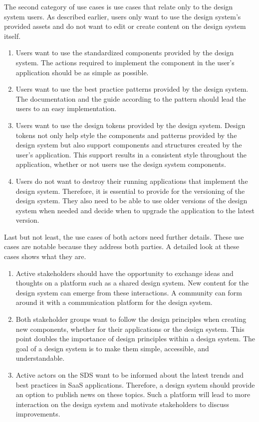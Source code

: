 The second category of use cases is use cases that relate only to the design system users. As described earlier, users only want to use the design system's provided assets and do not want to edit or create content on the design system itself.
\begin{enumerate}
    \item Users want to use the standardized components provided by the design system. The actions required to implement the component in the user's application should be as simple as possible.
    \item Users want to use the best practice patterns provided by the design system. The documentation and the guide according to the pattern should lead the users to an easy implementation.
    \item Users want to use the design tokens provided by the design system. Design tokens not only help style the components and patterns provided by the design system but also support components and structures created by the user's application. This support results in a consistent style throughout the application, whether or not users use the design system components. 
    \item Users do not want to destroy their running applications that implement the design system. Therefore, it is essential to provide for the versioning of the design system. They also need to be able to use older versions of the design system when needed and decide when to upgrade the application to the latest version. 
\end{enumerate}
Last but not least, the use cases of both actors need further details. These use cases are notable because they address both parties. A detailed look at these cases shows what they are.
\begin{enumerate}
    \item Active stakeholders should have the opportunity to exchange ideas and thoughts on a platform such as a shared design system. New content for the design system can emerge from these interactions. A community can form around it with a communication platform for the design system.  
    \item Both stakeholder groups want to follow the design principles when creating new components, whether for their applications or the design system. This point doubles the importance of design principles within a design system. The goal of a design system is to make them simple, accessible, and understandable. 
    \item Active actors on the SDS want to be informed about the latest trends and best practices in \ac{SaaS} applications. Therefore, a design system should provide an option to publish news on these topics. Such a platform will lead to more interaction on the design system and motivate stakeholders to discuss improvements.
\end{enumerate}

